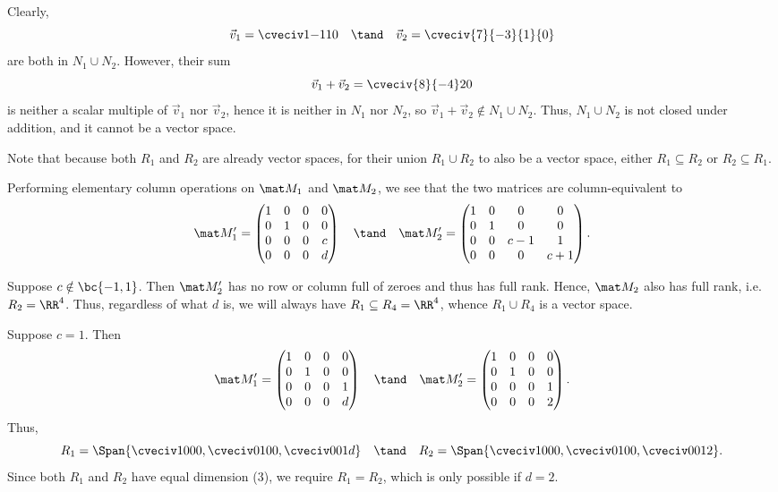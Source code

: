 \begin{solution}
\begin{ppart}
        Clearly, \[\vec v_1 = \cveciv1{-1}10 \quad \tand \quad \vec v_2 = \cveciv{7}{-3}{1}{0}\] are both in $N_1 \cup N_2$. However, their sum \[\vec v_1 + \vec v_2 = \cveciv{8}{-4}20\] is neither a scalar multiple of $\vec v_1$ nor $\vec v_2$, hence it is neither in $N_1$ nor $N_2$, so $\vec v_1 + \vec v_2 \notin N_1 \cup N_2$. Thus, $N_1 \cup N_2$ is not closed under addition, and it cannot be a vector space.
    \end{ppart}
    \begin{ppart}
        Note that because both $R_1$ and $R_2$ are already vector spaces, for their union $R_1 \cup R_2$ to also be a vector space, either $R_1 \subseteq R_2$ or $R_2 \subseteq R_1$.

        Performing elementary column operations on $\mat M_1$ and $\mat M_2$, we see that the two matrices are column-equivalent to \[\mat M_1' = \begin{pmatrix}1 & 0 & 0 & 0 \\ 0 & 1 & 0 & 0 \\ 0 & 0 & 0 & c \\ 0 & 0 & 0 & d\end{pmatrix} \quad \tand \quad \mat M_2' = \begin{pmatrix}1 & 0 & 0 & 0 \\ 0 & 1 & 0 & 0 \\ 0 & 0 & c-1 & 1 \\ 0 & 0 & 0 & c+1 \end{pmatrix}.\]

         Suppose $c \notin \bc{-1, 1}$. Then $\mat M_2'$ has no row or column full of zeroes and thus has full rank. Hence, $\mat M_2$ also has full rank, i.e. $R_2 = \RR^4$. Thus, regardless of what $d$ is, we will always have $R_1 \subseteq R_4 = \RR^4$, whence $R_1 \cup R_4$ is a vector space.

         Suppose $c = 1$. Then \[\mat M_1' = \begin{pmatrix}1 & 0 & 0 & 0 \\ 0 & 1 & 0 & 0 \\ 0 & 0 & 0 & 1 \\ 0 & 0 & 0 & d\end{pmatrix} \quad \tand \quad \mat M_2' = \begin{pmatrix}1 & 0 & 0 & 0 \\ 0 & 1 & 0 & 0 \\ 0 & 0 & 0 & 1 \\ 0 & 0 & 0 & 2 \end{pmatrix}.\] Thus, \[R_1 = \Span{\cveciv1000, \cveciv0100, \cveciv001d} \quad \tand \quad R_2 = \Span{\cveciv1000, \cveciv0100, \cveciv0012}.\] Since both $R_1$ and $R_2$ have equal dimension (3), we require $R_1 = R_2$, which is only possible if $d = 2$.


\end{ppart}
\end{solution}

